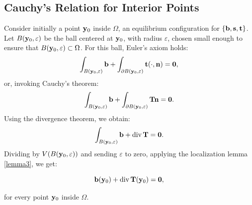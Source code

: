 \subsection{Cauchy’s Relation for Interior Points}
Consider initially a point \(\mathbf{y}_0\) inside \(\Omega\), an equilibrium configuration for \(\{\mathbf{b}, \mathbf{s}, \mathbf{t}\}\). Let \(B(\mathbf{y}_0, \varepsilon)\) be the ball centered at \(\mathbf{y}_0\), with radius \(\varepsilon\), chosen small enough to ensure that \(B(\mathbf{y}_0, \varepsilon) \subset \Omega\). For this ball, Euler's axiom holds:
\begin{equation}
	\int_{B(\mathbf{y}_0,\varepsilon)} \mathbf{b} + \int_{\partial B(\mathbf{y}_0,\varepsilon)} \mathbf{t}(\cdot, \mathbf{n}) = \mathbf{0},
\end{equation}
or, invoking Cauchy's theorem:
\begin{equation}
	\int_{B(\mathbf{y}_0, \varepsilon)} \mathbf{b} + \int_{\partial B(\mathbf{y}_0, \varepsilon)} \mathbf{T} \mathbf{n} = \mathbf{0}.
\end{equation}
Using the divergence theorem, we obtain:
\begin{equation}\label{eq1int}
	\int_{B(\mathbf{y}_0, \varepsilon)} \mathbf{b} + \operatorname{div} \mathbf{T} = \mathbf{0}.
\end{equation}
Dividing by \(V(B(\mathbf{y}_0, \varepsilon))\) and sending \(\varepsilon\) to zero, applying the localization lemma \eqref{lemma3}, we get:
\begin{definition}
	\begin{equation}\label{bDiv}
		\mathbf{b}(\mathbf{y}_0) + \operatorname{div} \mathbf{T}(\mathbf{y}_0) = \mathbf{0},
	\end{equation}
\end{definition}
for every point \(\mathbf{y}_0\) inside \(\Omega\).


